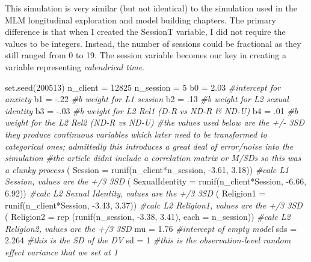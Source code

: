 \documentclass[
  11pt,
]{book}
\newenvironment{Shaded}{\begin{snugshade}}{\end{snugshade}}
\newcommand{\AttributeTok}[1]{\textcolor[rgb]{0.77,0.63,0.00}{#1}}
\newcommand{\CommentTok}[1]{\textcolor[rgb]{0.56,0.35,0.01}{\textit{#1}}}
\newcommand{\DecValTok}[1]{\textcolor[rgb]{0.00,0.00,0.81}{#1}}
\newcommand{\FloatTok}[1]{\textcolor[rgb]{0.00,0.00,0.81}{#1}}
\newcommand{\FunctionTok}[1]{\textcolor[rgb]{0.00,0.00,0.00}{#1}}
\newcommand{\NormalTok}[1]{#1}
\newcommand{\OtherTok}[1]{\textcolor[rgb]{0.56,0.35,0.01}{#1}}
\newcommand{\SpecialCharTok}[1]{\textcolor[rgb]{0.00,0.00,0.00}{#1}}
\begin{document}
This simulation is very similar (but not identical) to the simulation used in the MLM longitudinal exploration and model building chapters. The primary difference is that when I created the SessionT variable, I did not require the values to be integers. Instead, the number of sessions could be fractional as they still ranged from 0 to 19. The session variable becomes our key in creating a variable representing \emph{calendrical time}.

\begin{Shaded}
\begin{Highlighting}[]
\FunctionTok{set.seed}\NormalTok{(}\DecValTok{200513}\NormalTok{)}
\NormalTok{n\_client }\OtherTok{=} \DecValTok{12825}
\NormalTok{n\_session }\OtherTok{=} \DecValTok{5}
\NormalTok{b0 }\OtherTok{=} \FloatTok{2.03} \CommentTok{\#intercept for anxiety}
\NormalTok{b1 }\OtherTok{=} \SpecialCharTok{{-}}\NormalTok{.}\DecValTok{22} \CommentTok{\#b weight for L1 session}
\NormalTok{b2 }\OtherTok{=}\NormalTok{ .}\DecValTok{13} \CommentTok{\#b weight for L2 sexual identity}
\NormalTok{b3 }\OtherTok{=}  \SpecialCharTok{{-}}\NormalTok{.}\DecValTok{03} \CommentTok{\#b weight for L2 Rel1 (D{-}R vs ND{-}R \& ND{-}U)}
\NormalTok{b4 }\OtherTok{=}\NormalTok{ .}\DecValTok{01} \CommentTok{\#b weight for the L2 Rel2 (ND{-}R vs ND{-}U)}
\CommentTok{\#the values used below are the +/{-} 3SD they produce continuous variables which later need to be transformed to categorical ones; admittedly this introduces a great deal of error/noise into the simulation}
\CommentTok{\#the article didn\textquotesingle{}t include a correlation matrix or M/SDs so this was a clunky process }
\NormalTok{( }\AttributeTok{Session =} \FunctionTok{runif}\NormalTok{(n\_client}\SpecialCharTok{*}\NormalTok{n\_session, }\SpecialCharTok{{-}}\FloatTok{3.61}\NormalTok{, }\FloatTok{3.18}\NormalTok{)) }\CommentTok{\#calc L1 Session, values are the +/3 3SD}
\NormalTok{( }\AttributeTok{SexualIdentity =} \FunctionTok{runif}\NormalTok{(n\_client}\SpecialCharTok{*}\NormalTok{Session, }\SpecialCharTok{{-}}\FloatTok{6.66}\NormalTok{, }\FloatTok{6.92}\NormalTok{)) }\CommentTok{\#calc L2 Sexual Identity, values are the +/3 3SD}
\NormalTok{( }\AttributeTok{Religion1 =} \FunctionTok{runif}\NormalTok{(n\_client}\SpecialCharTok{*}\NormalTok{Session, }\SpecialCharTok{{-}}\FloatTok{3.43}\NormalTok{, }\FloatTok{3.37}\NormalTok{)) }\CommentTok{\#calc L2 Religion1, values are the +/3 3SD}
\NormalTok{( }\AttributeTok{Religion2 =} \FunctionTok{rep}\NormalTok{ (}\FunctionTok{runif}\NormalTok{(n\_session, }\SpecialCharTok{{-}}\FloatTok{3.38}\NormalTok{, }\FloatTok{3.41}\NormalTok{), }\AttributeTok{each =}\NormalTok{ n\_session)) }\CommentTok{\#calc L2 Religion2, values are the +/3 3SD}
\NormalTok{mu }\OtherTok{=} \FloatTok{1.76} \CommentTok{\#intercept of empty model }
\NormalTok{sds }\OtherTok{=} \FloatTok{2.264} \CommentTok{\#this is the SD of the DV}
\NormalTok{sd }\OtherTok{=} \DecValTok{1} \CommentTok{\#this is the observation{-}level random effect variance that we set at 1}


\end{Highlighting}
\end{Shaded}
\end{document}
